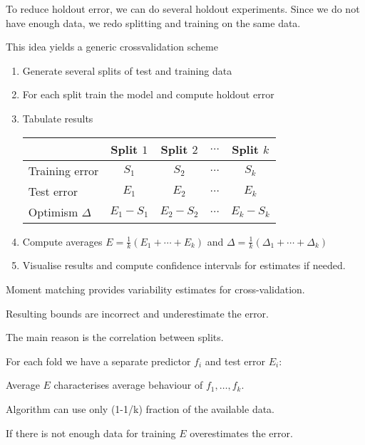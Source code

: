 \documentclass[landscape,footrule]{foils}
\begin{document}

\enlargethispage{0.7cm}

To reduce holdout error, we can do several holdout experiments. 
Since we do not have enough data, we redo splitting and training on the same data. 

This idea yields a generic crossvalidation scheme
\begin{enumerate}
\item Generate several splits of test and training data
\item For each split train the model and compute holdout error
\item Tabulate results\vspace*{2ex}
\begin{center}
\begin{tabular}{|l|c|c|c|c|}
\hline
 & Split $1$ & Split $2$ & $\ldots$ & Split $k$\\
 \hline
 Training error & $S_1$ & $S_2$ & $\ldots$ & $S_k$\\
 Test error     & $E_1$ & $E_2$ & $\ldots$ & $E_k$\\
\hline
 Optimism $\Delta$    & $E_1-S_1$ & $E_2-S_2$ & $\ldots$ & $E_k-S_k$\\
 \cline{2-5}
\hline
\end{tabular}
\end{center}
\vspace*{2ex}
\item Compute averages $E=\frac{1}{k}(E_1+\cdots+E_k)$ and $\Delta=\frac{1}{k}(\Delta_1+\cdots+\Delta_k)$
\item Visualise results and compute confidence intervals for estimates if needed. 
\end{enumerate}



Moment matching provides variability estimates for cross-validation. 
\begin{triangles}
\item Resulting bounds are incorrect and underestimate the error.
\item The main reason is the correlation between splits.   
\end{triangles}



For each fold we have a separate predictor $f_i$ and test error $E_i$:
\begin{triangles}
\item Average $E$ characterises average behaviour of $f_1,\ldots, f_k$.
\item Algorithm can use only (1-1/k) fraction of the available data.
\item If there is not enough data for training $E$ overestimates the error. \vspace*{1cm}  
\end{triangles}
\end{document}
